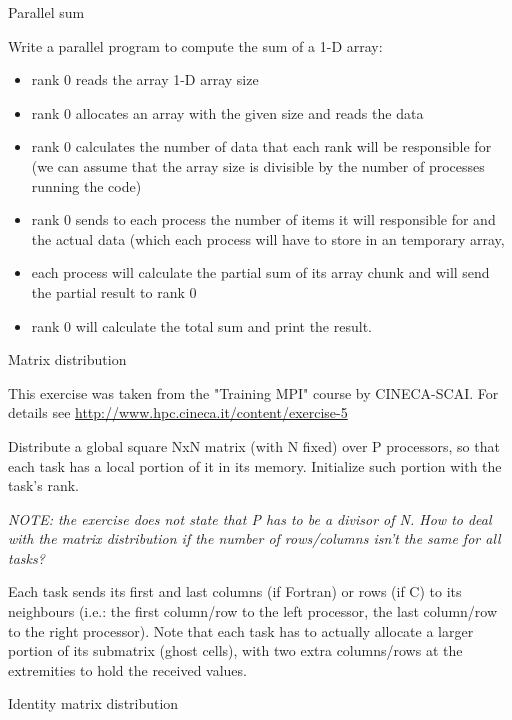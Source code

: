  {Parallel sum}
\label{ex:basic-mpi-sum}

Write a parallel program to compute the sum of a 1-D array:

\begin{itemize}
\item rank 0 reads the array 1-D array size

\item rank 0 allocates an array with the given size and reads the data

\item rank 0 calculates the number of data that each rank will be responsible for
(we can assume that the array size is divisible by the number of processes running
the code)

\item rank 0 sends to each process the number of items it will responsible for and
the actual data (which each process will have to store in an temporary array,
              
\item each process will calculate the partial sum of its array chunk and will send
the partial result to rank 0

\item rank 0 will calculate the total sum and print the result.

\end{itemize}


 {Matrix distribution}
\label{ex:basic-mpi-matrix-distribution}

This exercise was taken from the "Training MPI" course by CINECA-SCAI. For
details see \url{http://www.hpc.cineca.it/content/exercise-5}

Distribute a global square NxN matrix (with N fixed) over P processors, so that
each task has a local portion of it in its memory. Initialize such portion with
the task's rank.

\textit{NOTE: the exercise does not state that P has to be a divisor of N. How to deal
with the matrix distribution if the number of rows/columns isn't the same for
all tasks?}

Each task sends its first and last columns (if Fortran) or rows (if C) to its
neighbours (i.e.: the first column/row to the left processor, the last
column/row to the right processor). Note that each task has to actually allocate
a larger portion of its submatrix (ghost cells), with two extra columns/rows at
the extremities to hold the received values.  

 {Identity matrix distribution}
\label{ex:basic-mpi-id-matrix-distribution}

